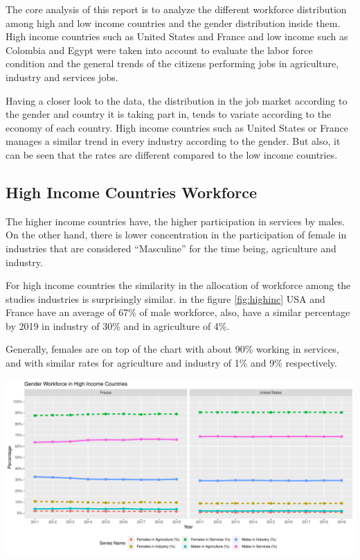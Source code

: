 \documentclass[11pt,a4paper,]{article}
\let\origfigure\figure
\let\endorigfigure\endfigure
\renewenvironment{figure}[1][2] {
    \expandafter\origfigure\expandafter[H]
} {
    \endorigfigure
}
\begin{document}
The core analysis of this report is to analyze the different workforce distribution among high and low income countries and the gender distribution inside them. High income countries such as United States and France and low income such as Colombia and Egypt were taken into account to evaluate the labor force condition and the general trends of the citizens performing jobs in agriculture, industry and services jobs.

Having a closer look to the data, the distribution in the job market according to the gender and country it is taking part in, tends to variate according to the economy of each country. High income countries such as United States or France manages a similar trend in every industry according to the gender. But also, it can be seen that the rates are different compared to the low income countries.

\hypertarget{high-income-countries-workforce}{%
\subsection{High Income Countries Workforce}\label{high-income-countries-workforce}}

The higher income countries have, the higher participation in services by males. On the other hand, there is lower concentration in the participation of female in industries that are considered ``Masculine'' for the time being, agriculture and industry.

For high income countries the similarity in the allocation of workforce among the studies industries is surprisingly similar. in the figure \ref{fig:highinc} USA and France have an average of 67\% of male workforce, also, have a similar percentage by 2019 in industry of 30\% and in agriculture of 4\%.

Generally, females are on top of the chart with about 90\% working in services, and with similar rates for agriculture and industry of 1\% and 9\% respectively.

\begin{figure}
\centering
\includegraphics{The_Outsiders_5513_files/figure-latex/highinc-1.pdf}
\caption{\label{fig:highinc}High Income Countries Workforce}
\end{figure}
\end{document}
